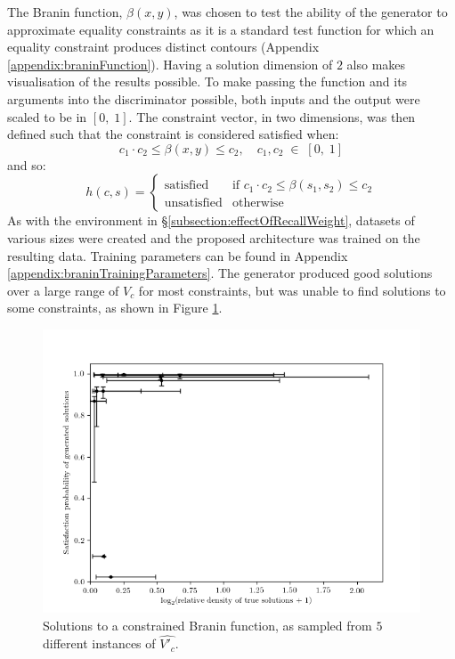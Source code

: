 \documentclass[../../main.tex]{subfiles}
\begin{document}
The Branin function, $\beta(x,y)$, was chosen to test the ability of the generator to approximate equality constraints as it is a standard test function for which an equality constraint produces distinct contours (Appendix \ref{appendix:braninFunction}).
Having a solution dimension of $2$ also makes visualisation of the results possible.
To make passing the function and its arguments into the discriminator possible, both inputs and the output were scaled to be in $[0,\;1]$.
The constraint vector, in two dimensions, was then defined such that the constraint is considered satisfied when:
\begin{equation}
    c_1\cdot c_2\le\beta(x,y)\le c_2,\quad c_1,c_2\;\in\;[0,\;1]
\end{equation}
and so:
\begin{equation}
    h(c,s)=\left\{\begin{array}{ll}\text{satisfied}&\mbox{if }c_1\cdot c_2\le\beta(s_1,s_2)\le c_2\\\text{unsatisfied}&\mbox{otherwise}\end{array}\right.
\end{equation}
As with the environment in \S\ref{subsection:effectOfRecallWeight}, datasets of various sizes were created and the proposed architecture was trained on the resulting data.
Training parameters can be found in Appendix \ref{appendix:braninTrainingParameters}.
The generator produced good solutions over a large range of $V_c$ for most constraints, but was unable to find solutions to some constraints, as shown in Figure \ref{fig:braninPropertiesW3}.
\begin{figure}[H]
    \begin{center}
    \includegraphics[width=\textwidth]{braninPropertiesW1}
    \caption{
        Solutions to a constrained Branin function, as sampled from $5$ different instances of $\hat{V'_c}$.
    }
    \label{fig:braninPropertiesW3}
    \end{center}
\end{figure}
\end{document}
